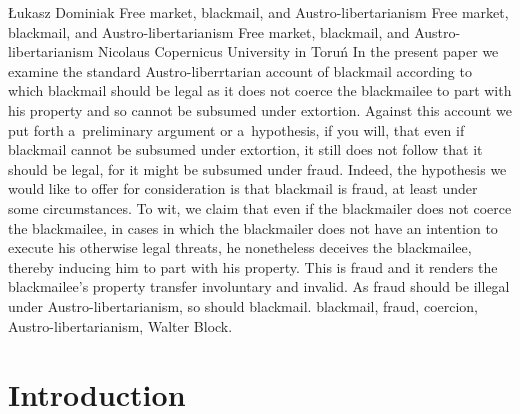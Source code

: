 \begin{artengenv}{Łukasz Dominiak}
	{Free market, blackmail, and Austro-libertarianism}
	{Free market, blackmail, and Austro-libertarianism}
	{Free market, blackmail, and Austro-libertarianism}
	{Nicolaus Copernicus University in Toruń}
	{In the present paper we examine the standard Austro-liberrtarian account of blackmail according to which blackmail should be legal as it does not coerce the blackmailee to part with his property and so cannot be subsumed under extortion. Against this account we put forth a~preliminary argument or a~hypothesis, if you will, that even if blackmail cannot be subsumed under extortion, it still does not follow that it should be legal, for it might be subsumed under fraud. Indeed, the hypothesis we would like to offer for consideration is that blackmail is fraud, at least under some circumstances. To wit, we claim that even if the blackmailer does not coerce the blackmailee, in cases in which the blackmailer does not have an intention to execute his otherwise legal threats, he nonetheless deceives the blackmailee, thereby inducing him to part with his property. This is fraud and it renders the blackmailee's property transfer involuntary and invalid. As fraud should be illegal under Austro-libertarianism, so should blackmail.
	}
	{blackmail, fraud, coercion, Austro-libertarianism, Walter Block.}















\section{Introduction}


\end{artengenv}
